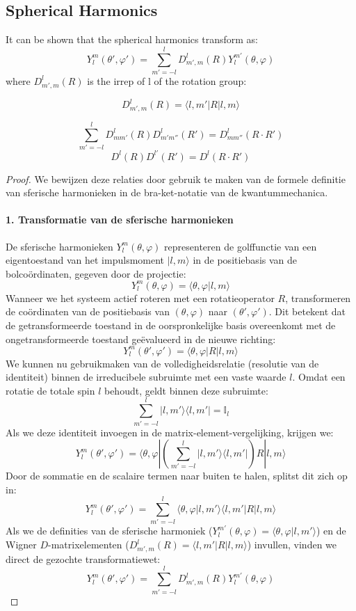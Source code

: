 \subsection{Spherical Harmonics}

It can be shown that the spherical harmonics transform as:
\[
Y^m_l(\theta',\varphi') = \sum_{m'=-l}^l D^l_{m',m}(R) Y^{m'}_l(\theta,\varphi)
\]
where \(D^l_{m',m}(R)\) is the irrep of l of the rotation group:

\[D^l_{m',m}(R) = \langle l, m' | R | l, m \rangle\]

\[\sum_{m'=-l}^{l} D^l_{mm'} (R)D^l_{m'm''} (R') = D^l_{m m''} (R \cdot R')\]
\[D^l(R)D^{l'}(R') = D^l(R \cdot R')\]



\begin{proof}
    We bewijzen deze relaties door gebruik te maken van de formele definitie van sferische harmonieken in de bra-ket-notatie van de kwantummechanica.

    \paragraph{1. Transformatie van de sferische harmonieken}
    De sferische harmonieken $Y_l^m(\theta, \varphi)$ representeren de golffunctie van een eigentoestand van het impulsmoment $|l, m\rangle$ in de positiebasis van de bolcoördinaten, gegeven door de projectie:
    \[
    Y_l^m(\theta, \varphi) = \langle \theta, \varphi | l, m \rangle
    \]
    Wanneer we het systeem actief roteren met een rotatieoperator $R$, transformeren de coördinaten van de positiebasis van $(\theta, \varphi)$ naar $(\theta', \varphi')$. Dit betekent dat de getransformeerde toestand in de oorspronkelijke basis overeenkomt met de ongetransformeerde toestand geëvalueerd in de nieuwe richting:
    \[
    Y^m_l(\theta',\varphi') = \langle \theta, \varphi | R | l, m \rangle
    \]
    We kunnen nu gebruikmaken van de volledigheidsrelatie (resolutie van de identiteit) binnen de irreducibele subruimte met een vaste waarde $l$. Omdat een rotatie de totale spin $l$ behoudt, geldt binnen deze subruimte:
    \[
    \sum_{m'=-l}^l |l, m'\rangle \langle l, m'| = \mathbb{I}_l
    \]
    Als we deze identiteit invoegen in de matrix-element-vergelijking, krijgen we:
    \[
    Y^m_l(\theta',\varphi') = \langle \theta, \varphi | \left( \sum_{m'=-l}^l |l, m'\rangle \langle l, m'| \right) R | l, m \rangle
    \]
    Door de sommatie en de scalaire termen naar buiten te halen, splitst dit zich op in:
    \[
    Y^m_l(\theta',\varphi') = \sum_{m'=-l}^l \langle \theta, \varphi | l, m'\rangle \langle l, m' | R | l, m \rangle
    \]
    Als we de definities van de sferische harmoniek ($Y^{m'}_l(\theta, \varphi) = \langle \theta, \varphi | l, m'\rangle$) en de Wigner $D$-matrixelementen ($D^l_{m',m}(R) = \langle l, m' | R | l, m \rangle$) invullen, vinden we direct de gezochte transformatiewet:
    \[
    Y^m_l(\theta',\varphi') = \sum_{m'=-l}^l D^l_{m',m}(R) Y^{m'}_l(\theta,\varphi)
    \]


\end{proof}
